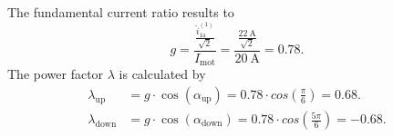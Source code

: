 \begin{solutionblock}
    The fundamental current ratio results to
    \begin{equation}
        g=\frac{\frac{\hat{i}_\mathrm{1a}^\mathrm{(1)}}{\sqrt{2}}}{I_\mathrm{mot}}=\frac{\frac{\SI{22}{\ampere}}{\sqrt{2}}}{\SI{20}{\ampere}}=0.78.
    \end{equation}
    The power factor $\lambda$ is calculated by
    \begin{equation}
        \begin{split}
            \lambda_\mathrm{up}&=g \cdot \cos{(\alpha_\mathrm{up})}=0.78  \cdot cos(\frac{\pi}{6})= 0.68. \\
            \lambda_\mathrm{down}&=g \cdot \cos{(\alpha_\mathrm{down})}=0.78  \cdot cos(\frac{5\pi}{6})= -0.68.
        \end{split}
    \end{equation}
\end{solutionblock}
